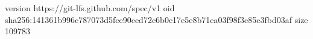 version https://git-lfs.github.com/spec/v1
oid sha256:141361b996c787073d5fce90ced72c6b0c17e5e8b71ea03f98f3e85c3fbd03af
size 109783
